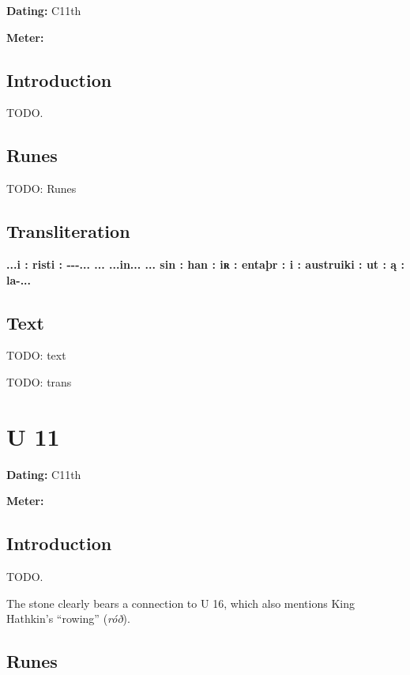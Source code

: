 \begin{flushright}%
\textbf{Dating:} C11th

\textbf{Meter:} \Fornyrdislag
\end{flushright}%

\subsection{Introduction}

TODO.

\subsection{Runes}

TODO: Runes%

\subsection{Transliteration}

\textbf{...i : risti : -{}-{}-... ... ...in... ... sin : han : iʀ : entaþr : i : austruiki : ut : ą : la-...}

\subsection{Text}

\bpg\bpa[0]%
TODO: text\epa

\bpb TODO: trans\epb\epg

\sectionline\clearpage


\section{U 11}

\begin{flushright}%
\textbf{Dating:} C11th

\textbf{Meter:} \Fornyrdislag
\end{flushright}%

\subsection{Introduction}

TODO.

The stone clearly bears a connection to U 16, which also mentions King Hathkin’s “rowing” (\emph{róð}).

\subsection{Runes}

